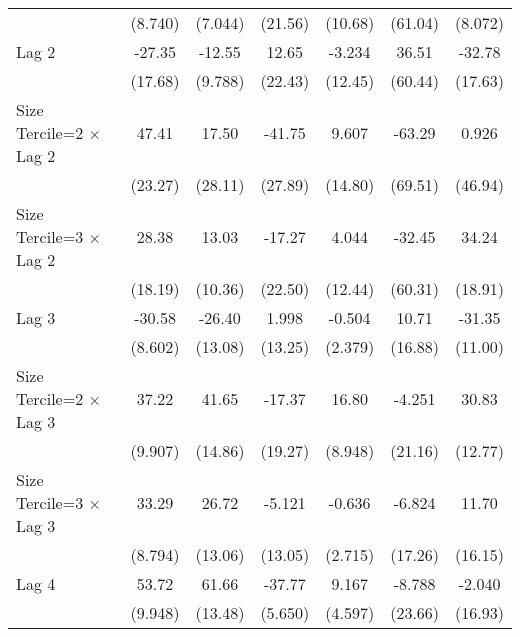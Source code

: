 \begin{table}[htbp]
\begin{tabular}{l*{6}{c}}
                &  (8.740)         &  (7.044)         &  (21.56)         &  (10.68)         &  (61.04)         &  (8.072)         \\
\addlinespace
Lag 2           &   -27.35         &   -12.55         &    12.65         &   -3.234         &    36.51         &   -32.78         \\
                &  (17.68)         &  (9.788)         &  (22.43)         &  (12.45)         &  (60.44)         &  (17.63)         \\
\addlinespace
Size Tercile=2 $\times$ Lag 2&    47.41\sym{*}  &    17.50         &   -41.75         &    9.607         &   -63.29         &    0.926         \\
                &  (23.27)         &  (28.11)         &  (27.89)         &  (14.80)         &  (69.51)         &  (46.94)         \\
\addlinespace
Size Tercile=3 $\times$ Lag 2&    28.38         &    13.03         &   -17.27         &    4.044         &   -32.45         &    34.24         \\
                &  (18.19)         &  (10.36)         &  (22.50)         &  (12.44)         &  (60.31)         &  (18.91)         \\
\addlinespace
Lag 3           &   -30.58\sym{***}&   -26.40\sym{*}  &    1.998         &   -0.504         &    10.71         &   -31.35\sym{**} \\
                &  (8.602)         &  (13.08)         &  (13.25)         &  (2.379)         &  (16.88)         &  (11.00)         \\
\addlinespace
Size Tercile=2 $\times$ Lag 3&    37.22\sym{***}&    41.65\sym{**} &   -17.37         &    16.80         &   -4.251         &    30.83\sym{*}  \\
                &  (9.907)         &  (14.86)         &  (19.27)         &  (8.948)         &  (21.16)         &  (12.77)         \\
\addlinespace
Size Tercile=3 $\times$ Lag 3&    33.29\sym{***}&    26.72\sym{*}  &   -5.121         &   -0.636         &   -6.824         &    11.70         \\
                &  (8.794)         &  (13.06)         &  (13.05)         &  (2.715)         &  (17.26)         &  (16.15)         \\
\addlinespace
Lag 4           &    53.72\sym{***}&    61.66\sym{***}&   -37.77\sym{***}&    9.167\sym{*}  &   -8.788         &   -2.040         \\
                &  (9.948)         &  (13.48)         &  (5.650)         &  (4.597)         &  (23.66)         &  (16.93)         \\

\end{tabular}
\end{table}
